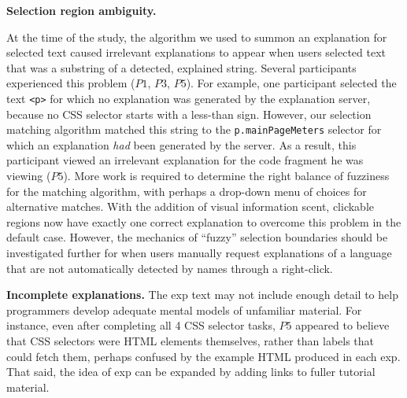 {\bf Selection region ambiguity.}
\begin{changes}
At the time of the study, the algorithm we used to summon an explanation for selected text caused irrelevant explanations to appear when users selected text that was a substring of a detected, explained string.
Several participants experienced this problem ($P1$, $P3$, $P5$).
For example, one participant selected the text \texttt{<p>} for which no explanation was generated by the explanation server, because no CSS selector starts with a less-than sign.
However, our selection matching algorithm matched this string to the \texttt{p.mainPageMeters} selector for which an explanation \emph{had} been generated by the server.
As a result, this participant viewed an irrelevant explanation for the code fragment he was viewing ($P5$).
More work is required to determine the right balance of fuzziness for the matching algorithm, with perhaps a drop-down menu of choices for alternative matches.
\fi
With the addition of visual information scent, clickable regions now have exactly one correct explanation to overcome this problem in the default case.
However, the mechanics of ``fuzzy'' selection boundaries should be investigated further for when users manually request explanations of a language that are not automatically detected by \Glspl{name} through a right-click.
\end{changes}

{\bf Incomplete explanations.} The  \gls{exp} text may not include enough detail to help programmers  develop adequate mental models of unfamiliar material. For instance,
even after completing all 4 CSS selector tasks, $P5$ appeared to believe that CSS selectors were HTML elements themselves, rather than labels that could fetch them, perhaps confused by the example HTML produced in each \gls{exp}.
That said, the idea of \gls{exp} can be expanded by adding links to fuller tutorial material.
